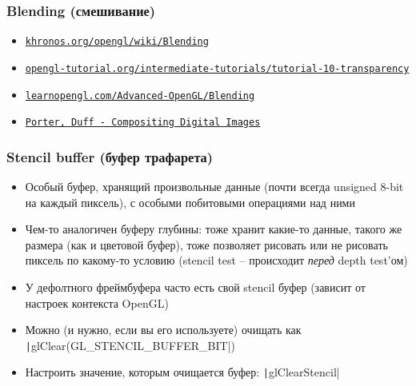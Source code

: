 \documentclass[10pt]{beamer}
\begin{document}
\begin{frame}[fragile]
\frametitle{Blending (смешивание)}
\begin{itemize}
\item \href{https://www.khronos.org/opengl/wiki/Blending}{\texttt{khronos.org/opengl/wiki/Blending}}
\item \href{http://www.opengl-tutorial.org/intermediate-tutorials/tutorial-10-transparency/}{\texttt{opengl-tutorial.org/intermediate-tutorials/tutorial-10-transparency}}
\item \href{https://learnopengl.com/Advanced-OpenGL/Blending}{\texttt{learnopengl.com/Advanced-OpenGL/Blending}}
\item \href{https://graphics.pixar.com/library/Compositing/paper.pdf}{\texttt{Porter, Duff - Compositing Digital Images}}
\end{itemize}
\end{frame}

\begin{frame}[fragile]
\frametitle{Stencil buffer (буфер трафарета)}
\begin{itemize}
\item Особый буфер, хранящий произвольные данные (почти всегда unsigned 8-bit на каждый пиксель), с особыми побитовыми операциями над ними
\pause
\item Чем-то аналогичен буферу глубины: тоже хранит какие-то данные, такого же размера (как и цветовой буфер), тоже позволяет рисовать или не рисовать пиксель по какому-то условию (stencil test -- происходит \textit{перед} depth test'ом)
\pause
\item У дефолтного фреймбуфера часто есть свой stencil буфер (зависит от настроек контекста OpenGL)
\pause
\item Можно (и нужно, если вы его используете) очищать как \texttt|glClear(GL_STENCIL_BUFFER_BIT|)
\pause
\item Настроить значение, которым очищается буфер: \texttt|glClearStencil|
\end{itemize}
\end{frame}
\end{document}
